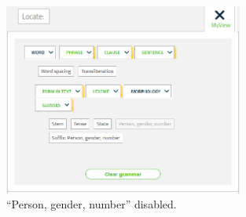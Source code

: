 \documentclass[11pt,oneside,a4paper]{memoir}
\begin{document}
\begin{figure}
  \begin{center}
    \includegraphics[width=0.7\textwidth]{fig-no-gender.png}
  \end{center}
  \caption{``Person, gender, number'' disabled.}\label{fig-no-gender}
\end{figure}

\printindex
\end{document}
